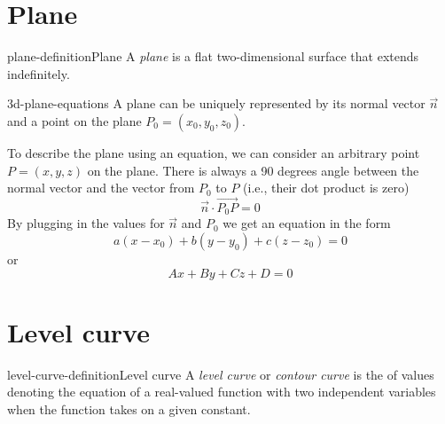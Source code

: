 \documentclass[preview]{standalone}
\begin{document}
\genpage

\section{Plane}

\begin{snippetdefinition}{plane-definition}{Plane}
    A \textit{plane} is a flat two-dimensional surface that extends indefinitely.
\end{snippetdefinition}

\begin{snippet}{3d-plane-equations}
    A plane can be uniquely represented by its
    normal vector \(\vec{n}\)
    and a point on the plane \(P_0=(x_0, y_0, z_0)\).

    To describe the plane using an equation, we can
    consider an arbitrary point \(P=(x,y,z)\) on the plane.
    There is always a 90 degrees angle between the normal
    vector and the vector from \(P_0\) to \(P\) (i.e., their dot product is zero)
    \[
        \vec{n} \cdot \overrightarrow{P_0 P} = 0
    \]
    By plugging in the values for \(\vec{n}\) and \(P_0\)
    we get an equation in the form
    \[
        a(x-x_0) + b(y-y_0) + c(z-z_0) = 0
    \]
    or
    \[
        Ax+By+Cz+D=0
    \]
\end{snippet}

\section{Level curve}


\begin{snippetdefinition}{level-curve-definition}{Level curve}
    A \textit{level curve} or \textit{contour curve}
    is the \set of values denoting the equation
    of a real-valued function with two independent variables
    when the function takes on a given constant.
\end{snippetdefinition}


\end{document}
